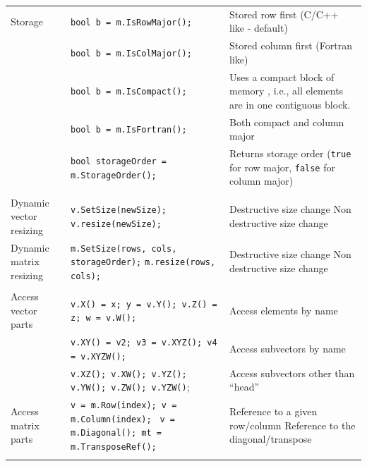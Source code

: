 \documentclass[letterpaper,10pt]{article}
\newcommand{\doublehlinethree}{\hline & & \\ [-10pt] \hline}
\begin{document}
\begin{center}
\begin{tabular}{|p{1.1in}|p{3.1in}|p{2.6in}|}
          Storage  &  \texttt{bool b = m.IsRowMajor();} & 
          Stored row first (C/C++ like - default) \\
          & \texttt{bool b = m.IsColMajor();} &
          Stored column first (Fortran like) \\
          & \texttt{bool b = m.IsCompact();} &
          Uses a compact block of memory , i.e., all elements are in
          one contiguous block. \\
          & \texttt{bool b = m.IsFortran();} &
          Both compact and column major \\
          & \texttt{bool storageOrder = m.StorageOrder();}
          & Returns storage order ({\tt true} for row major, {\tt false}
          for column major) \\
          \doublehlinethree

          Dynamic vector\newline
          resizing
          &
          \texttt{v.SetSize(newSize);} \newline
          \texttt{v.resize(newSize);}
          &
          Destructive size change \newline
          Non destructive size change
          \\
          \hline
          Dynamic matrix\newline
          resizing
          &
          \texttt{m.SetSize(rows, cols, storageOrder);} \newline
          \texttt{m.resize(rows, cols);}
          &
          Destructive size change \newline
          Non destructive size change
          \\
          \doublehlinethree

          Access vector parts
          &
          \texttt{v.X() = x; y = v.Y(); v.Z() = z; w = v.W();} 
          &
          Access elements by name \\
          &
          \texttt{v.XY() = v2; v3 = v.XYZ(); v4 = v.XYZW();}
          &
          Access subvectors by name \\
          &
          \texttt{v.XZ(); v.XW(); v.YZ(); v.YW(); v.ZW(); v.YZW()};
          &
          Access subvectors other than ``head'' \\
          \hline

          Access matrix parts
          &
          \texttt{v = m.Row(index); v = m.Column(index); } \newline
          \texttt{v = m.Diagonal(); mt = m.TransposeRef(); }
          &
          Reference to a given row/column \newline
          Reference to the diagonal/transpose
          \\
          \doublehlinethree


\end{tabular}
\end{center}
\end{document}
